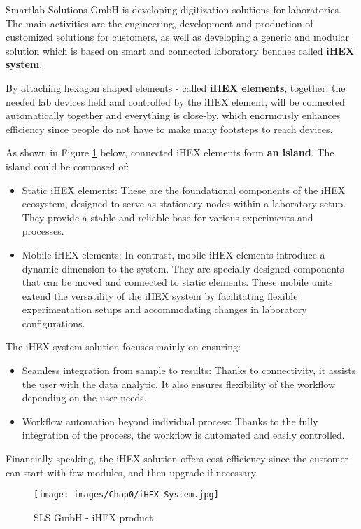 Smartlab Solutions GmbH is developing digitization solutions for laboratories. The main activities are the engineering, development and production of customized solutions for customers, as well as developing a generic and modular solution which is based on smart and connected laboratory benches called \textbf{iHEX system}.

By attaching hexagon shaped elements - called \textbf{iHEX elements}, together, the needed lab devices held and controlled by the iHEX element, will be connected automatically together and everything is close-by, which enormously enhances efficiency since people do not have to make many footsteps to reach devices.

As shown in Figure \ref{iHEX photo} below, connected iHEX elements form \textbf{an island}. The island could be composed of:
\begin{itemize}
    \item Static iHEX elements: These are the foundational components of the iHEX ecosystem, designed to serve as stationary nodes within a laboratory setup. They provide a stable and reliable base for various experiments and processes.
    \item Mobile iHEX elements: In contrast, mobile iHEX elements introduce a dynamic dimension to the system. They are specially designed components that can be moved and connected to static elements. These mobile units extend the versatility of the iHEX system by facilitating flexible experimentation setups and accommodating changes in laboratory configurations.
\end{itemize}

The iHEX system solution focuses mainly on ensuring:
\begin{itemize}
    \item Seamless integration from sample to results: Thanks to connectivity, it assists the user with the data analytic. It also ensures flexibility of the workflow depending on the user needs.
    \item Workflow automation beyond individual process: Thanks to the fully integration of the process, the workflow is automated and easily controlled.
\end{itemize}

Financially speaking, the iHEX solution offers cost-efficiency since the customer can start with few modules, and then upgrade if necessary. \cite{R8}

\begin{figure}[H]
\begin{center}
\texttt{[image: images/Chap0/iHEX System.jpg]}\\
\caption{SLS GmbH - iHEX product}
\label{iHEX photo}
\end{center}
\end{figure} 


